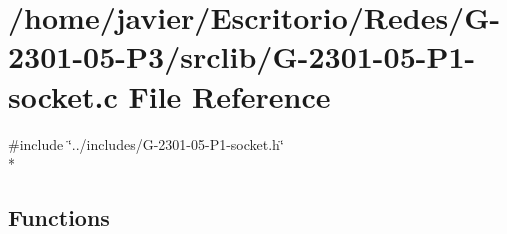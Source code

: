 \hypertarget{_g-2301-05-_p1-socket_8c}{\section{/home/javier/\-Escritorio/\-Redes/\-G-\/2301-\/05-\/\-P3/srclib/\-G-\/2301-\/05-\/\-P1-\/socket.c File Reference}
\label{_g-2301-05-_p1-socket_8c}
}
{\ttfamily \#include \char`\"{}../includes/\-G-\/2301-\/05-\/\-P1-\/socket.\-h\char`\"{}}\\*
\subsection*{Functions}
